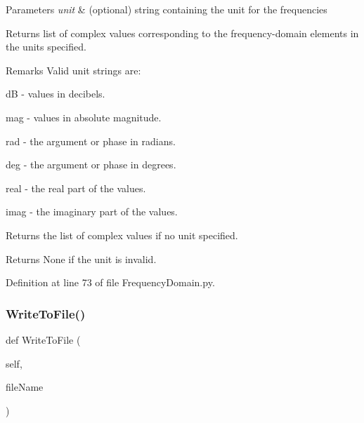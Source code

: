 \begin{DoxyParams}{Parameters}
{\em unit} & (optional) string containing the unit for the frequencies \\
\hline
\end{DoxyParams}
\begin{DoxyReturn}{Returns}
list of complex values corresponding to the frequency-\/domain elements in the units specified. 
\end{DoxyReturn}
\begin{DoxyRemark}{Remarks}
Valid unit strings are\+:
\begin{DoxyItemize}
\item \textquotesingle{}dB\textquotesingle{} -\/ values in decibels.
\item \textquotesingle{}mag\textquotesingle{} -\/ values in absolute magnitude.
\item \textquotesingle{}rad\textquotesingle{} -\/ the argument or phase in radians.
\item \textquotesingle{}deg\textquotesingle{} -\/ the argument or phase in degrees.
\item \textquotesingle{}real\textquotesingle{} -\/ the real part of the values.
\item \textquotesingle{}imag\textquotesingle{} -\/ the imaginary part of the values.
\end{DoxyItemize}
\end{DoxyRemark}
Returns the list of complex values if no unit specified.

Returns None if the unit is invalid. 

Definition at line 73 of file Frequency\+Domain.\+py.

\mbox{\label{classSignalIntegrity_1_1FrequencyDomain_1_1FrequencyDomain_1_1FrequencyDomain_a9bc60dff701312ba7ddf47ee941bbc8f}} 
\subsubsection{\texorpdfstring{Write\+To\+File()}{WriteToFile()}}
{\footnotesize\ttfamily def Write\+To\+File (\begin{DoxyParamCaption}\item[{}]{self,  }\item[{}]{file\+Name }\end{DoxyParamCaption})}



